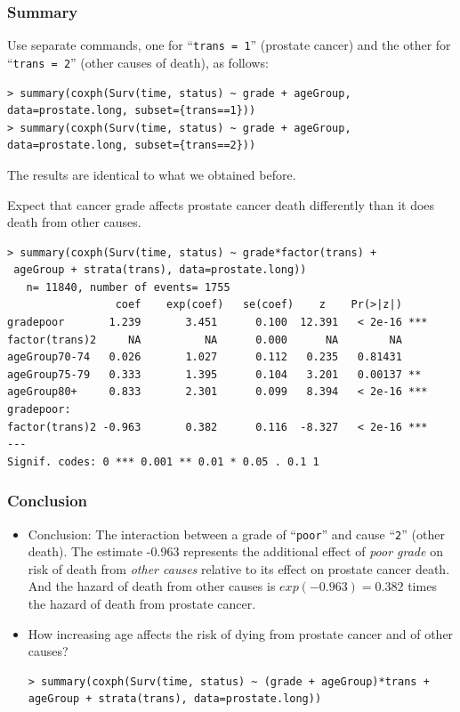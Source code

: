 \documentclass{beamer}
\newcommand{\empr}[1]{{\emph{\color{red}#1}}}
\begin{document}
\pagebreak
\begin{frame}[fragile]
\frametitle{Summary}
\begin{itemize}
\item {\footnotesize Use separate commands, one for ``\texttt{trans = 1}'' (prostate cancer) and the other for ``\texttt{trans = 2}'' (other causes of death), as follows:}
\begin{Verbatim}
> summary(coxph(Surv(time, status) ~ grade + ageGroup,
data=prostate.long, subset={trans==1}))
> summary(coxph(Surv(time, status) ~ grade + ageGroup,
data=prostate.long, subset={trans==2}))
\end{Verbatim}  
\item {\footnotesize The results are identical to what we obtained before.
\item Expect that cancer grade affects prostate cancer death differently than it does death from other causes.}
\begin{Verbatim}
> summary(coxph(Surv(time, status) ~ grade*factor(trans) +
 ageGroup + strata(trans), data=prostate.long))
   n= 11840, number of events= 1755
                 coef    exp(coef)   se(coef)    z    Pr(>|z|)
gradepoor       1.239       3.451      0.100  12.391   < 2e-16 ***
factor(trans)2     NA          NA      0.000      NA        NA    
ageGroup70-74   0.026       1.027      0.112   0.235   0.81431
ageGroup75-79   0.333       1.395      0.104   3.201   0.00137 ** 
ageGroup80+     0.833       2.301      0.099   8.394   < 2e-16 ***
gradepoor: 
factor(trans)2 -0.963       0.382      0.116  -8.327   < 2e-16 ***
---
Signif. codes: 0 *** 0.001 ** 0.01 * 0.05 . 0.1 1
\end{Verbatim} 
\end{itemize}
\end{frame}

\pagebreak
\begin{frame}[fragile]
\frametitle{Conclusion}
\begin{itemize}
\item Conclusion: The  interaction between a grade of ``\texttt{poor}'' and cause ``\texttt{2}'' (other death). The estimate -0.963 represents the additional effect of \empr{poor grade} on risk of death from \empr{other causes} relative to its effect on prostate cancer death. And the hazard of death from other causes is $exp(-0.963) = 0.382$ times the hazard of death from prostate cancer.
\item How increasing age affects the risk of dying from prostate cancer and of other causes?
\begin{Verbatim}
> summary(coxph(Surv(time, status) ~ (grade + ageGroup)*trans +
ageGroup + strata(trans), data=prostate.long))
\end{Verbatim}  
\end{itemize}
\end{frame}
\end{document}
